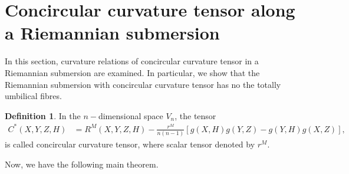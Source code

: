 \documentclass{birkjour}
\theoremstyle{definition}
\newtheorem{definition}[theorem]{Definition}
\theoremstyle{remark}
\numberwithin{equation}{section}
\begin{document}
\section{Concircular curvature tensor along a Riemannian submersion}
In this section, curvature relations of concircular curvature tensor in a Riemannian submersion are examined. In particular, we show  that the Riemannian submersion with concircular curvature tensor has no the totally umbilical fibres.
\begin{definition}\rm \label{defconcir}
	In the $n-$dimensional space $V_n$, the tensor
	\begin{align*}
		C^*(X,Y,Z,H)&=R^M(X,Y,Z,H)- \frac{r^M}{n(n-1)} [g(X,H)g(Y,Z)-g(Y,H)g(X,Z)],
	\end{align*}
	is called concircular curvature tensor, where scalar tensor denoted by $r^M$\cite{mishra}.
\end{definition}
Now, we have the following main theorem.
\end{document}
